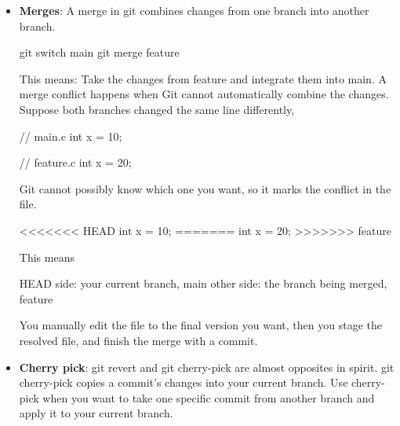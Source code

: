 \documentclass{report}
\begin{document}
\begin{itemize}
            \begin{bashcode}
                git apply changes.patch
            \end{bashcode}
            \bigbreak \noindent 
            That modifies their working tree using the changes described in the patch.
        \item \textbf{Merges}: A merge in git combines changes from one branch into another branch.
            \bigbreak \noindent 
            \begin{bashcode}
                git switch main
                git merge feature
            \end{bashcode}
            \bigbreak \noindent 
            This means: Take the changes from feature and integrate them into main.
            \bigbreak \noindent 
            A merge conflict happens when Git cannot automatically combine the changes. Suppose both branches changed the same line differently,
            \bigbreak \noindent 
            \begin{cppcode}
                // main.c
                int x = 10;
            \end{cppcode}
            \bigbreak \noindent 
            \begin{bashcode}
                // feature.c
                int x = 20;
            \end{bashcode}
            \bigbreak \noindent 
            Git cannot possibly know which one you want, so it marks the conflict in the file.
            \bigbreak \noindent 
            \begin{bashcode}
                <<<<<<< HEAD
                int x = 10;
                =======
                int x = 20;
                >>>>>>> feature
            \end{bashcode}
            \bigbreak \noindent 
            This means
            \bigbreak \noindent 
            \begin{bashcode}
                HEAD side:    your current branch, main
                other side:   the branch being merged, feature
            \end{bashcode}
            \bigbreak \noindent 
            You manually edit the file to the final version you want, then you stage the resolved file, and finish the merge with a commit.
        \item \textbf{Cherry pick}:  git revert and git cherry-pick are almost opposites in spirit.
            \bigbreak \noindent 
            git cherry-pick copies a commit’s changes into your current branch. Use cherry-pick when you want to take one specific commit from another branch and apply it to your current branch.

\end{itemize}
\end{document}
